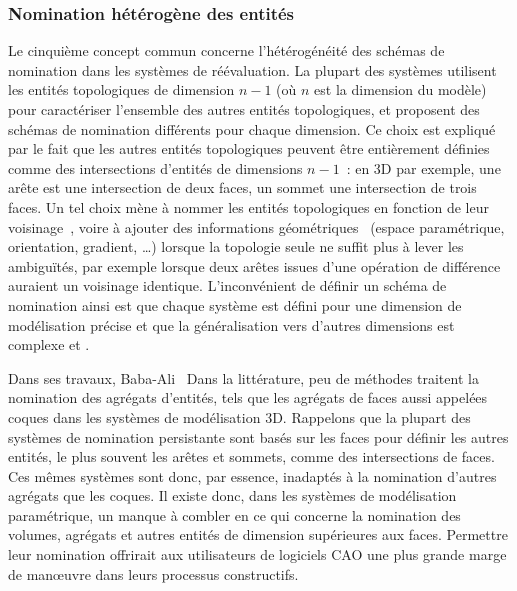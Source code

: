 \subsubsection*{Nomination hétérogène des entités}


Le cinquième concept commun concerne l'hétérogénéité des schémas de nomination
dans les systèmes de réévaluation. %
La plupart des systèmes utilisent les entités topologiques de dimension \(n-1\)
(où \(n\) est la dimension du modèle) pour caractériser l'ensemble des autres
entités topologiques, et proposent des schémas de nomination différents pour
chaque dimension. Ce choix est expliqué par le fait que les autres entités
topologiques peuvent être entièrement définies comme des intersections d'entités
de dimensions \(n-1\)~: en 3D par exemple, une arête est une intersection de
deux faces, un sommet une intersection de trois faces. %
Un tel choix mène à nommer les entités topologiques en fonction de leur
voisinage~\cite{CAPOYLEAS199617,chen1995representation,kripac1995mechanism,agbodan2000persistent},
voire à ajouter des informations
géométriques~\cite{wu2001face,bidarra2005feature,wang2005geometry} (espace
paramétrique, orientation, gradient, …) lorsque la topologie seule ne suffit
plus à lever les ambiguïtés, par exemple lorsque deux arêtes issues d'une
opération de différence auraient un voisinage identique. %
L'inconvénient de définir un schéma de nomination ainsi est que chaque système
est défini pour une dimension de modélisation précise et que la généralisation
vers d'autres dimensions est  complexe et
. %

Dans ses travaux, Baba-Ali~\cite{babaali2010systeme}  %
Dans la littérature, peu de méthodes traitent la nomination des agrégats
d'entités, tels que les agrégats de faces aussi appelées coques dans les
systèmes de modélisation 3D. %
Rappelons que la plupart des systèmes de nomination persistante sont basés sur
les faces pour définir les autres entités, le plus souvent les arêtes et
sommets, comme des intersections de faces. %
Ces mêmes systèmes sont donc, par essence, inadaptés à la nomination d'autres
agrégats que les coques. %
Il existe donc, dans les systèmes de modélisation paramétrique, un manque à
combler en ce qui concerne la nomination des volumes, agrégats et autres
entités de dimension supérieures aux faces. %
Permettre leur nomination offrirait aux utilisateurs de logiciels CAO une plus
grande marge de man\oe uvre dans leurs processus constructifs. %





